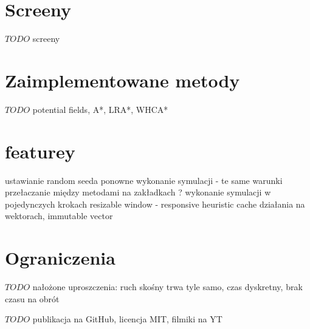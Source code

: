 \section{Screeny}
$TODO$ screeny

\section{Zaimplementowane metody}
$TODO$ potential fields, A*, LRA*, WHCA*

\section{featurey}
ustawianie random seeda
ponowne wykonanie symulacji - te same warunki
przełaczanie między metodami na zakładkach ?
wykonanie symulacji w pojedynczych krokach
resizable window - responsive
heuristic cache
działania na wektorach, immutable vector

\section{Ograniczenia}
$TODO$ nałożone uproszczenia: ruch skośny trwa tyle samo, czas dyskretny, brak czasu na obrót

$TODO$ publikacja na GitHub, licencja MIT, filmiki na YT